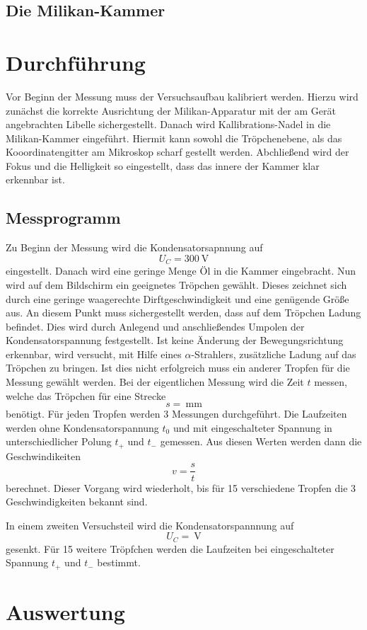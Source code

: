 \documentclass[11pt,ngerman,a4paper]{article}
\begin{document}
\subsection{Die Milikan-Kammer}
\section{Durchf\"uhrung}
Vor Beginn der Messung muss der Versuchsaufbau kalibriert werden. Hierzu wird zun\"achst die korrekte Ausrichtung der Milikan-Apparatur mit der am Ger\"at angebrachten Libelle sichergestellt. Danach wird Kallibrations-Nadel in die Milikan-Kammer eingef\"uhrt. Hiermit kann sowohl die Tr\"opchenebene, als das Kooordinatengitter am Mikroskop scharf gestellt werden. Abchlie\ss end wird der Fokus und die Helligkeit so eingestellt, dass das innere der Kammer klar  erkennbar ist.
\subsection{Messprogramm}
Zu Beginn der Messung wird die Kondensatorsapnnung auf 
\[
U_C = \SI{300}{\volt}
\]
eingestellt. Danach wird  eine geringe Menge \"Ol in die Kammer eingebracht. Nun wird auf dem Bildschirm ein geeignetes Tr\"opchen gew\"ahlt. Dieses zeichnet sich durch eine geringe waagerechte Dirftgeschwindigkeit und eine gen\"ugende Gr\"o\ss e aus. An diesem Punkt muss sichergestellt werden, dass auf dem Tr\"opchen Ladung befindet. Dies wird durch Anlegend und anschlie\ss endes Umpolen der Kondensatorspannung festgestellt. Ist keine \"Anderung der Bewegungsrichtung erkennbar, wird versucht, mit Hilfe eines $\alpha$-Strahlers, zus\"atzliche Ladung auf das Tr\"opchen zu bringen. Ist dies nicht erfolgreich muss ein anderer Tropfen f\"ur die Messung gew\"ahlt werden.
Bei der eigentlichen Messung wird die Zeit $t$ messen, welche das Tr\"opchen f\"ur eine Strecke
\[
s = \SI{}{\milli\meter}
\]
ben\"otigt. F\"ur jeden Tropfen werden 3 Messungen durchgef\"uhrt. Die Laufzeiten werden ohne Kondensatorspannung $t_0$ und mit eingeschalteter Spannung in unterschiedlicher Polung $t_+$ und $t_-$ gemessen. Aus diesen Werten werden dann die Geschwindikeiten
\[
v = \frac{s}{t}
\]
berechnet. Dieser Vorgang wird wiederholt, bis f\"ur 15 verschiedene Tropfen die 3 Geschwindigkeiten bekannt sind.

In einem zweiten Versuchsteil wird die Kondensatorspannnung auf 
\[
U_C = \SI{}{\volt}
\]
gesenkt. F\"ur 15 weitere Tr\"opfchen werden die Laufzeiten bei eingeschalteter Spannung $t_+$ und $t_-$ bestimmt.
\section{Auswertung}
\end{document}
